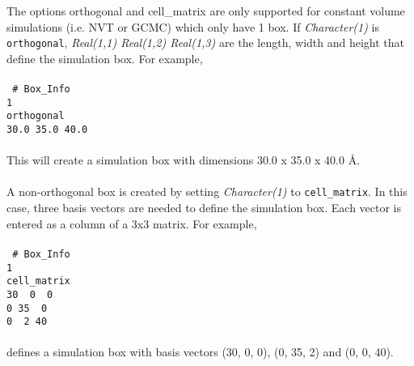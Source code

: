 The options orthogonal and cell\_matrix are only supported for constant volume simulations 
(i.e. NVT or GCMC) which only have 1 box. 
If {\it Character(1)} is \texttt{orthogonal}, \emph{Real(1,1) Real(1,2) Real(1,3)} are the length, 
width and height that define the simulation box. For example, \\ \\
%
\texttt{
\# Box\_Info \\
 1 \\
 orthogonal \\
 30.0 35.0 40.0} \\ \\
%
This will create a simulation box with dimensions 30.0 x 35.0 x 40.0 \AA. \\ \\
%
A non-orthogonal box is created by setting {\it Character(1)} to \texttt{cell\_matrix}. 
In this case, three basis vectors are needed to define the simulation box.
Each vector is entered as a column of a 3x3 matrix.  
For example, \\ \\
%
\texttt{
\# Box\_Info \\
 1 \\
 cell\_matrix \\
 30 ~0 ~0\\
\hspace*{0.5em}0 35 ~0\\
\hspace*{0.5em}0 ~2 40} \\ \\
%
defines a simulation box with basis vectors (30, 0, 0), (0, 35, 2) and (0, 0, 40).
%
%
%
%
%
